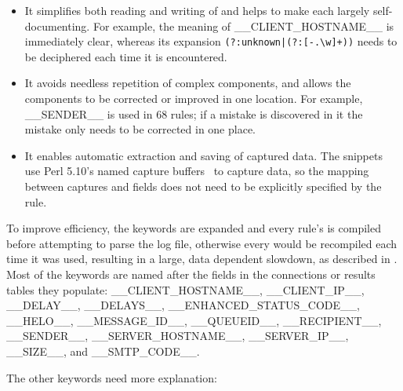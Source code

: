 \begin{itemize}

    \item It simplifies both reading and writing of \regexes{} and helps to
        make each  largely self-documenting.  For example,
        the meaning of \_\_CLIENT\_HOSTNAME\_\_ is immediately clear,
        whereas its expansion \verb!(?:unknown|(?:[-.\w]+))! needs to be
        deciphered each time it is encountered.

    \item It avoids needless repetition of complex 
        components, and allows the components to be corrected or improved
        in one location.  For example, \_\_SENDER\_\_ is used in 68 rules;
        if a mistake is discovered in it the mistake only needs to be
        corrected in one place.

    \item It enables automatic extraction and saving of captured data.  The
         snippets use Perl 5.10's named capture
        buffers~\cite{perlre} to capture data, so the mapping between
        captures and fields does not need to be explicitly specified by the
        rule.

\end{itemize}

To improve efficiency, the keywords are expanded and every rule's
 is compiled before attempting to parse the log file,
otherwise every  would be recompiled each time it was used,
resulting in a large, data dependent slowdown, as described in
.  Most of the keywords are named
after the fields in the connections or results tables they populate:
\_\_CLIENT\_HOSTNAME\_\_, \_\_CLIENT\_IP\_\_, \_\_DELAY\_\_,
\_\_DELAYS\_\_, \_\_ENHANCED\_STATUS\_CODE\_\_, \_\_HELO\_\_,
\_\_MESSAGE\_ID\_\_, \newline{} \_\_QUEUEID\_\_, \_\_RECIPIENT\_\_,
\_\_SENDER\_\_, \_\_SERVER\_HOSTNAME\_\_, \_\_SERVER\_IP\_\_, \_\_SIZE\_\_,
and \_\_SMTP\_CODE\_\_.

The other keywords need more explanation:

